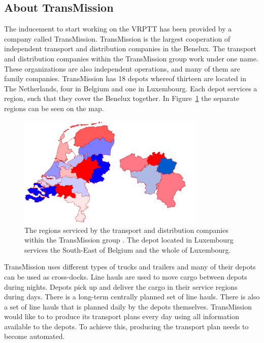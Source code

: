 

\subsection{About TransMission}
The inducement to start working on the VRPTT has been provided by a company called TransMission.
TransMission is the largest cooperation of independent transport and distribution companies in the Benelux. The transport and distribution companies within the TransMission group work under one name. These organizations are also independent operations, and many of them are family companies. TransMission has 18 depots whereof thirteen are located in The Netherlands, four in Belgium and one in Luxembourg. Each depot services a region, such that  they cover the Benelux together. In Figure~\ref{fig:regions} the separate regions can be seen on the map. \\

\begin{figure}[!ht]
  \centering
    \includegraphics[width=0.8\textwidth]{img/transmission_regions.pdf}
  \caption{The regions serviced by the transport and distribution companies within the TransMission group . The depot located in Luxembourg services the South-East of Belgium and the whole of Luxembourg.}
  \label{fig:regions}
\end{figure}

TransMission uses different types of trucks and trailers and many of their depots can be used as cross-docks.
Line hauls are used to move cargo between depots during nights. Depots pick up and deliver the cargo in their service regions during days. There is a long-term centrally planned set of line hauls. There is also a set of line hauls that is planned daily  by the depots themselves.
TransMission would like to to produce its transport plans every day using all information available to the depots.
To achieve this, producing the transport plan needs to become automated.




